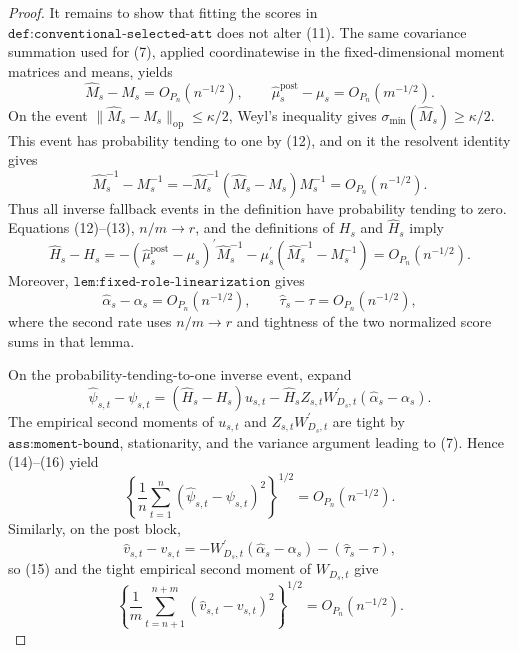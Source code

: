 \documentclass{article}
\begin{document}
\begin{proof}
It remains to show that fitting the scores in \(\texttt{def:conventional-selected-att}\) does not alter (11).  The same covariance summation used for (7), applied coordinatewise in the fixed-dimensional moment matrices and means, yields
\[
 \widehat M_s-M_s=O_{P_n}(n^{-1/2}),
 \qquad
 \widehat\mu_s^{\mathrm{post}}-\mu_s=O_{P_n}(m^{-1/2}).                            \tag{12}
\]
On the event \(\lVert\widehat M_s-M_s\rVert_{\mathrm{op}}\leq\kappa/2\), Weyl's inequality gives \(\sigma_{\min}(\widehat M_s)\geq\kappa/2\).  This event has probability tending to one by (12), and on it the resolvent identity gives
\[
 \widehat M_s^{-1}-M_s^{-1}
 =-\widehat M_s^{-1}(\widehat M_s-M_s)M_s^{-1}
 =O_{P_n}(n^{-1/2}).                                                                 \tag{13}
\]
Thus all inverse fallback events in the definition have probability tending to zero.  Equations (12)--(13), \(n/m\to r\), and the definitions of \(H_s\) and \(\widehat H_s\) imply
\[
 \widehat H_s-H_s
 =-(\widehat\mu_s^{\mathrm{post}}-\mu_s)^{\prime}\widehat M_s^{-1}
   -\mu_s^{\prime}(\widehat M_s^{-1}-M_s^{-1})
 =O_{P_n}(n^{-1/2}).                                                                 \tag{14}
\]
Moreover, \(\texttt{lem:fixed-role-linearization}\) gives
\[
 \widehat\alpha_s-\alpha_s=O_{P_n}(n^{-1/2}),
 \qquad
 \widehat\tau_s-\tau=O_{P_n}(n^{-1/2}),                                            \tag{15}
\]
where the second rate uses \(n/m\to r\) and tightness of the two normalized score sums in that lemma.

On the probability-tending-to-one inverse event, expand
\[
 \widehat\psi_{s,t}-\psi_{s,t}
 =(\widehat H_s-H_s)u_{s,t}
  -\widehat H_sZ_{s,t}W_{D_s,t}^{\prime}(\widehat\alpha_s-\alpha_s).                \tag{16}
\]
The empirical second moments of \(u_{s,t}\) and \(Z_{s,t}W_{D_s,t}^{\prime}\) are tight by \(\texttt{ass:moment-bound}\), stationarity, and the variance argument leading to (7).  Hence (14)--(16) yield
\[
 \left\{\frac1n\sum_{t=1}^n
   (\widehat\psi_{s,t}-\psi_{s,t})^2\right\}^{1/2}
 =O_{P_n}(n^{-1/2}).                                                                 \tag{17}
\]
Similarly, on the post block,
\[
 \widehat v_{s,t}-v_{s,t}
 =-W_{D_s,t}^{\prime}(\widehat\alpha_s-\alpha_s)
   -(\widehat\tau_s-\tau),
\]
so (15) and the tight empirical second moment of \(W_{D_s,t}\) give
\[
 \left\{\frac1m\sum_{t=n+1}^{n+m}
   (\widehat v_{s,t}-v_{s,t})^2\right\}^{1/2}
 =O_{P_n}(n^{-1/2}).                                                                 \tag{18}
\]


\end{proof}
\end{document}
